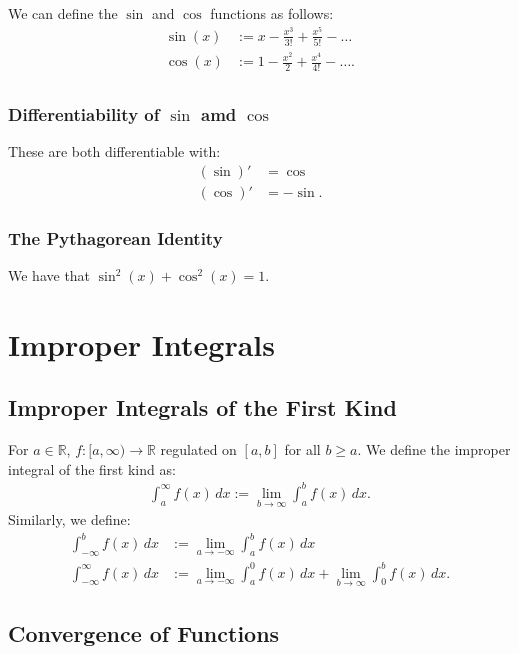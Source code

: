 \documentclass[a4paper, 12pt, twoside]{article}
\begin{document}
We can define the $\sin$ and $\cos$ functions as follows:
\begin{align*}
      \sin(x) &:= x - \frac{x^3}{3!} + \frac{x^5}{5!} - \ldots \\
      \cos(x) &:= 1 - \frac{x^2}{2} + \frac{x^4}{4!} - \ldots. \\
\end{align*}

\subsubsection{Differentiability of $\sin$ amd $\cos$}

These are both differentiable with:
\begin{align*}
      (\sin)' &= \cos \\
      (\cos)' &= -\sin.
\end{align*}

\subsubsection{The Pythagorean Identity}

We have that $\sin^2(x) + \cos^2(x) = 1$.

\section{Improper Integrals}

\subsection{Improper Integrals of the First Kind}

For $a \in \mathbb{R}$, $f:[a, \infty) \to \mathbb{R}$ regulated
on $[a, b]$ for all $b \geq a$. We define the improper integral
of the first kind as:
\begin{align*}
      \int_a^\infty f(x) \, dx := \lim_{b\to\infty}\int_a^b f(x) \, dx.
\end{align*}
Similarly, we define:
\begin{align*}
      \int_{-\infty}^b f(x) \, dx &:= \lim_{a\to-\infty}\int_a^b f(x) \, dx \\
      \int_{-\infty}^{\infty} f(x) \, dx &:=
            \lim_{a\to-\infty}\int_a^0 f(x) \, dx
            + \lim_{b\to\infty}\int_0^b f(x) \, dx.
\end{align*}

\subsection{Convergence of Functions}
\end{document}
